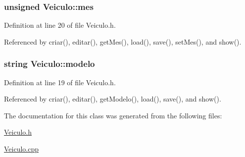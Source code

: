 \hypertarget{class_veiculo_ac4146f7b3d38e31e3225074e0fb0dea9}{
\subsubsection[{mes}]{\setlength{\rightskip}{0pt plus 5cm}unsigned Veiculo\+::mes\hspace{0.3cm}{\ttfamily [private]}}}\label{class_veiculo_ac4146f7b3d38e31e3225074e0fb0dea9}


Definition at line 20 of file Veiculo.\+h.



Referenced by criar(), editar(), get\+Mes(), load(), save(), set\+Mes(), and show().

\hypertarget{class_veiculo_a313c15811b7fffa4787eea0dcf12fc13}{
\subsubsection[{modelo}]{\setlength{\rightskip}{0pt plus 5cm}string Veiculo\+::modelo\hspace{0.3cm}{\ttfamily [private]}}}\label{class_veiculo_a313c15811b7fffa4787eea0dcf12fc13}


Definition at line 19 of file Veiculo.\+h.



Referenced by criar(), editar(), get\+Modelo(), load(), save(), and show().



The documentation for this class was generated from the following files\+:\begin{DoxyCompactItemize}
\item 
\hyperlink{_veiculo_8h}{Veiculo.\+h}\item 
\hyperlink{_veiculo_8cpp}{Veiculo.\+cpp}\end{DoxyCompactItemize}
